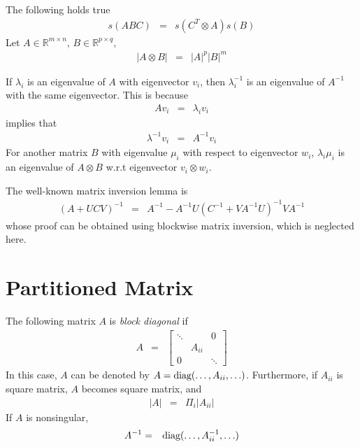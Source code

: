 The following holds true
\begin{eqnarray}
	s(ABC) &=& s(C^T\otimes A)s(B) \nonumber
\end{eqnarray}
Let $A\in\mathbb{R}^{m\times n}$, $B\in\mathbb{R}^{p\times q}$,
\begin{eqnarray}
	|A\otimes B| &=& |A|^p|B|^m \nonumber
\end{eqnarray}

If $\lambda_i$ is an eigenvalue of $A$ with eigenvector $v_i$, then $\lambda_i^{-1}$ is an eigenvalue of $A^{-1}$ with the same eigenvector. This is because
\begin{eqnarray}
	Av_i &=& \lambda_iv_i \nonumber
\end{eqnarray}
implies that
\begin{eqnarray}
	\lambda^{-1}v_i &=& A^{-1}v_i \nonumber
\end{eqnarray}
For another matrix $B$ with eigenvalue $\mu_i$ with respect to eigenvector $w_i$, $\lambda_i\mu_i$ is an eigenvalue of $A\otimes B$ w.r.t eigenvector $v_i\otimes w_i$.

The well-known matrix inversion lemma is
\begin{eqnarray}
  (A + UCV)^{-1} &=& A^{-1} - A^{-1}U\left(C^{-1}+VA^{-1}U\right)^{-1}VA^{-1} \nonumber
\end{eqnarray}
whose proof can be obtained using blockwise matrix inversion, which is neglected here.

\section{Partitioned Matrix}

The following matrix $A$ is \textit{block diagonal} if
\begin{eqnarray}
	A &=& \left[\begin{array}{ccc}
		\ddots &  & 0 \\
		 & A_{ii} &  \\
		0 &  & \ddots
	\end{array}\right] \nonumber
\end{eqnarray}
In this case, $A$ can be denoted by $A=\textup{diag}(\ldots, A_{ii}, \ldots)$. Furthermore, if $A_{ii}$ is square matrix, $A$ becomes square matrix, and
\begin{eqnarray}
	|A| &=& \Pi_{i}|A_{ii}| \nonumber
\end{eqnarray}
If $A$ is nonsingular,
\begin{eqnarray}
	A^{-1} &=& \textup{diag}(\ldots, A_{ii}^{-1}, \ldots) \nonumber
\end{eqnarray}

